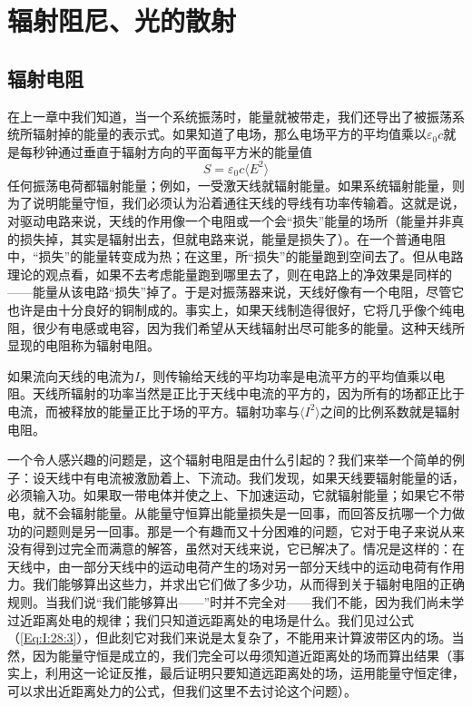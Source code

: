 \chapter{辐射阻尼、光的散射}

\section{辐射电阻}

在上一章中我们知道，当一个系统振荡时，能量就被带走，我们还导出了被振荡系统所辐射掉的能量的表示式。如果知道了电场，那么电场平方的平均值乘以$\varepsilon_0c$就是每秒钟通过垂直于辐射方向的平面每平方米的能量值
\begin{equation}
    \label{Eq:I:32:1}
    S=\varepsilon_0c \langle E^2 \rangle
\end{equation}
任何振荡电荷都辐射能量；例如，一受激天线就辐射能量。如果系统辐射能量，则为了说明能量守恒，我们必须认为沿着通往天线的导线有功率传输着。这就是说，对驱动电路来说，天线的作用像一个电阻或一个会“损失”能量的场所（能量并非真的损失掉，其实是辐射出去，但就电路来说，能量是损失了）。在一个普通电阻中，“损失”的能量转变成为热；在这里，所“损失”的能量跑到空间去了。但从电路理论的观点看，如果不去考虑能量跑到哪里去了，则在电路上的净效果是同样的——能量从该电路“损失”掉了。于是对振荡器来说，天线好像有一个电阻，尽管它也许是由十分良好的铜制成的。事实上，如果天线制造得很好，它将几乎像个纯电阻，很少有电感或电容，因为我们希望从天线辐射出尽可能多的能量。这种天线所显现的电阻称为辐射电阻。

如果流向天线的电流为$I$，则传输给天线的平均功率是电流平方的平均值乘以电阻。天线所辐射的功率当然是正比于天线中电流的平方的，因为所有的场都正比于电流，而被释放的能量正比于场的平方。辐射功率与$\langle I^2 \rangle$之间的比例系数就是辐射电阻。

一个令人感兴趣的问题是，这个辐射电阻是由什么引起的？我们来举一个简单的例子：设天线中有电流被激励着上、下流动。我们发现，如果天线要辐射能量的话，必须输入功。如果取一带电体并使之上、下加速运动，它就辐射能量；如果它不带电，就不会辐射能量。从能量守恒算出能量损失是一回事，而回答反抗哪一个力做功的问题则是另一回事。那是一个有趣而又十分困难的问题，它对于电子来说从来没有得到过完全而满意的解答，虽然对天线来说，它已解决了。情况是这样的：在天线中，由一部分天线中的运动电荷产生的场对另一部分天线中的运动电荷有作用力。我们能够算出这些力，并求出它们做了多少功，从而得到关于辐射电阻的正确规则。当我们说“我们能够算出——”时并不完全对——我们不能，因为我们尚未学过近距离处电的规律；我们只知道远距离处的电场是什么。我们见过公式（\ref{Eq:I:28:3}），但此刻它对我们来说是太复杂了，不能用来计算波带区内的场。当然，因为能量守恒是成立的，我们完全可以毋须知道近距离处的场而算出结果（事实上，利用这一论证反推，最后证明只要知道远距离处的场，运用能量守恒定律，可以求出近距离处力的公式，但我们这里不去讨论这个问题）。

